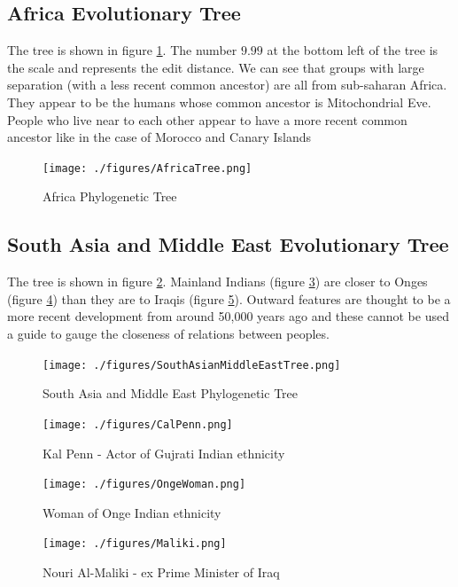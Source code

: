 \documentclass[conference]{IEEEtran}
\begin{document}
\FloatBarrier
\subsection{Africa Evolutionary Tree}

The tree is shown in figure \ref{AfricaTree}. The number $9.99$ at the bottom left of the tree is the scale and represents the edit distance. We can see that groups with large separation (with a less recent common ancestor) are all from sub-saharan Africa. They appear to be the humans whose common ancestor is Mitochondrial Eve. People who live near to each other appear to have a more recent common ancestor like in the case of Morocco and Canary Islands

\begin{figure}[!t]
\centering
\texttt{[image: ./figures/AfricaTree.png]}
\caption{Africa Phylogenetic Tree}
\label{AfricaTree}
\end{figure}

\FloatBarrier
\subsection{South Asia and Middle East Evolutionary Tree}

The tree is shown in figure \ref{SouthAsianMiddleEastTree}. Mainland Indians (figure \ref{KalPenn}) are closer to Onges (figure \ref{OngeWoman}) than they are to Iraqis (figure \ref{Maliki}). Outward features are thought to be  a more recent development from around 50,000 years ago \cite{TextBook1} and these cannot be used a guide to gauge the closeness of relations between peoples.

\begin{figure}[!t]
\centering
\texttt{[image: ./figures/SouthAsianMiddleEastTree.png]}
\caption{South Asia and Middle East Phylogenetic Tree}
\label{SouthAsianMiddleEastTree}
\end{figure}

\begin{figure}[!t]
\centering
\texttt{[image: ./figures/CalPenn.png]}
\caption{Kal Penn - Actor of Gujrati Indian ethnicity}
\label{KalPenn}
\end{figure}

\begin{figure}[!t]
\centering
\texttt{[image: ./figures/OngeWoman.png]}
\caption{Woman of Onge Indian ethnicity}
\label{OngeWoman}
\end{figure}

\begin{figure}[!t]
\centering
\texttt{[image: ./figures/Maliki.png]}
\caption{Nouri Al-Maliki - ex Prime Minister of Iraq}
\label{Maliki}
\end{figure}
\end{document}
